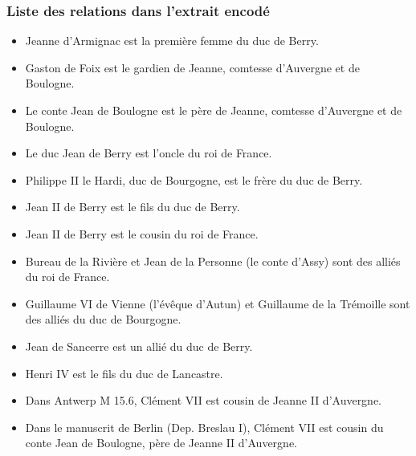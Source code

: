 \documentclass[12pt, a4paper]{article}
\begin{document}
	\subsubsection{Liste des relations dans l'extrait encodé}
	\begin{itemize} \item{ Jeanne d'Armignac est la première femme du duc de Berry.}  \item{ Gaston de Foix est le gardien de Jeanne, comtesse d'Auvergne et de Boulogne.}  \item{ Le conte Jean de Boulogne est le père de Jeanne, comtesse d'Auvergne et de Boulogne.}  \item{ Le duc Jean de Berry est l'oncle du roi de France.}  \item{ Philippe II le Hardi, duc de Bourgogne, est le frère du duc de Berry.}  \item{ Jean II de Berry est le fils du duc de Berry.}  \item{ Jean II de Berry est le cousin du roi de France.}  \item{ Bureau de la Rivière et Jean de la Personne (le conte d'Assy) sont des alliés du roi de France.}  \item{ Guillaume VI de Vienne (l'évêque d'Autun) et Guillaume de la Trémoille sont des alliés du duc de Bourgogne.}  \item{ Jean de Sancerre est un allié du duc de Berry.}  \item{ Henri IV est le fils du duc de Lancastre.}  \item{ Dans Antwerp M 15.6, Clément VII est cousin de Jeanne II d'Auvergne.}  \item{ Dans le manuscrit de Berlin (Dep. Breslau I), Clément VII est cousin du conte Jean de Boulogne, père de Jeanne II d'Auvergne.}  \end{itemize} 
	
\end{document}
